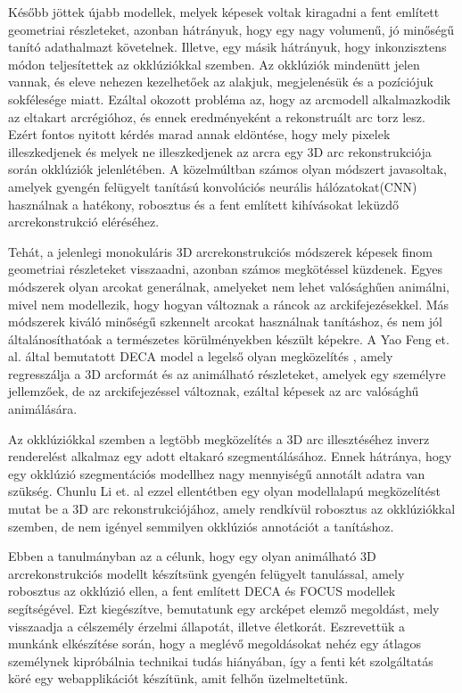 \documentclass[12pt,a4]{article}
\begin{document}
    Később jöttek újabb modellek, melyek képesek voltak kiragadni a fent említett geometriai részleteket, azonban hátrányuk, hogy egy nagy volumenű,
 jó minőségű tanító adathalmazt követelnek. Illetve, egy másik hátrányuk, hogy inkonzisztens módon teljesítettek az okklúziókkal szemben. Az okklúziók mindenütt jelen vannak, és eleve nehezen kezelhetőek az alakjuk, megjelenésük és a pozíciójuk sokfélesége miatt. Ezáltal okozott probléma az, hogy az arcmodell alkalmazkodik az eltakart arcrégióhoz, és ennek eredményeként a rekonstruált arc torz lesz. Ezért fontos nyitott kérdés marad annak eldöntése, hogy mely pixelek illeszkedjenek és melyek ne illeszkedjenek az arcra egy 3D arc rekonstrukciója során okklúziók jelenlétében. A közelmúltban számos olyan módszert javasoltak, amelyek gyengén felügyelt tanítású konvolúciós neurális hálózatokat(CNN) használnak a hatékony, robosztus és a fent említett kihívásokat leküzdő arcrekonstrukció eléréséhez.
	 
    Tehát, a jelenlegi monokuláris 3D arcrekonstrukciós módszerek képesek finom geometriai részleteket visszaadni, azonban számos megkötéssel
küzdenek. Egyes módszerek olyan arcokat generálnak, amelyeket nem lehet valósághűen animálni, mivel nem modellezik, hogy hogyan változnak a ráncok az arckifejezésekkel. Más módszerek kiváló minőségű szkennelt arcokat használnak tanításhoz, és nem jól általánosíthatóak a természetes körülményekben készült képekre. A Yao Feng et. al. által bemutatott DECA model a legelső olyan megközelítés \cite{deca}, amely regresszálja a 3D arcformát és az animálható részleteket, amelyek egy személyre jellemzőek, de az arckifejezéssel változnak, ezáltal képesek az arc valósághű animálására.
	 
Az okklúziókkal szemben a legtöbb megközelítés a 3D arc illesztéséhez inverz renderelést alkalmaz egy adott eltakaró szegmentálásához. Ennek hátránya, hogy egy okklúzió szegmentációs modellhez nagy mennyiségű annotált adatra van szükség. Chunlu Li et. al \cite{focus} ezzel ellentétben egy olyan modellalapú megközelítést mutat be a 3D arc rekonstrukciójához, amely rendkívül robosztus az okklúziókkal szemben, de nem igényel semmilyen okklúziós annotációt a tanításhoz.
	 
Ebben a tanulmányban az a célunk, hogy egy olyan animálható 3D arcrekonstrukciós modellt készítsünk gyengén felügyelt tanulással, amely robosztus az okklúzió ellen, a fent említett DECA és FOCUS modellek segítségével. Ezt kiegészítve, bemutatunk egy arcképet elemző megoldást, mely visszaadja a célszemély érzelmi állapotát, illetve életkorát. Eszrevettük a munkánk elkészítése során, hogy a meglévő megoldásokat nehéz egy átlagos személynek kipróbálnia technikai tudás hiányában, így a fenti két szolgáltatás köré egy webapplikációt készítünk, amit felhőn üzelmeltetünk.\\
	 
\end{document}
